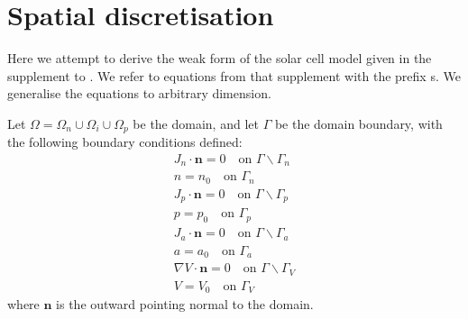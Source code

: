 \documentclass[a4paper,11pt]{article}
\renewcommand{\vec}[1]{\mathbf{#1}}
\begin{document}
\section{Spatial discretisation}

Here we attempt to derive the weak form of the solar cell model given in the
supplement to \cite{Calado2016}. We refer to equations from that supplement
with the prefix s. We generalise the equations to arbitrary dimension.

Let $\Omega = \Omega_n \cup \Omega_i \cup \Omega_p$ be the domain, and let
$\Gamma$ be the domain boundary, with the following boundary conditions
defined:
\begin{gather}
  J_n\cdot\vec{n} = 0 \quad\textrm{on }\Gamma\backslash\Gamma_n\\
  n = n_0 \quad\textrm{on }\Gamma_n\\
  J_p\cdot\vec{n} = 0 \quad\textrm{on }\Gamma\backslash\Gamma_p\\
  p = p_0 \quad\textrm{on }\Gamma_p\\
  J_a\cdot\vec{n} = 0 \quad\textrm{on }\Gamma\backslash\Gamma_a\\
  a = a_0 \quad\textrm{on }\Gamma_a\\
  \nabla V\cdot\vec{n} = 0 \quad\textrm{on }\Gamma\backslash\Gamma_V\\
  V = V_0 \quad\textrm{on }\Gamma_V
\end{gather}
where $\vec{n}$ is the outward pointing normal to the domain.
\end{document}
